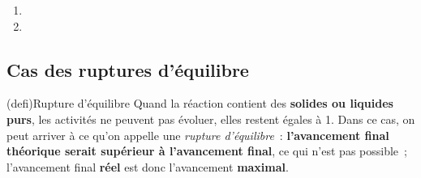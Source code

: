\documentclass[../../main/main.tex]{subfiles}
\begin{document}
\begin{tcb}[width=\linewidth, breakable]
\begin{enumerate}
		\item
		      \vspace{-15pt}
		\item
	\end{enumerate}
\end{tcb}

\subsection{Cas des ruptures d'équilibre}
\label{ssec:rupture}

\begin{tcb*}(defi){Rupture d'équilibre}
	Quand la réaction contient des \textbf{solides ou liquides purs}, les
	activités ne peuvent pas évoluer, elles restent égales à 1. Dans ce cas, on
	peut arriver à ce qu'on appelle une \textit{rupture d'équilibre}~:
	\textbf{l'avancement final théorique serait supérieur à l'avancement final},
	ce qui n'est pas possible~; l'avancement final \textbf{réel} est donc
	l'avancement \textbf{maximal}.
\end{tcb*}
\end{document}
